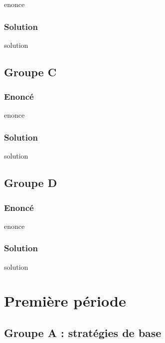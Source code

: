 \documentclass[12pt,A4]{book}
\theoremstyle{definition}
\theoremstyle{thm}
\theoremstyle{def}
\newcounter{sol}[subsection]
\begin{document}
{enonce}

\subsection{Solution}

{solution}



\section{Groupe C}

\subsection{Enoncé}

{enonce}

\subsection{Solution}

{solution}



\section{Groupe D}

\subsection{Enoncé}

{enonce}

\subsection{Solution}

{solution}



\chapter{Première période}
\minitoc \bigskip




\section {Groupe A : stratégies de base}
\end{document}
